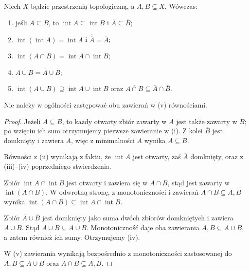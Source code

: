 \begin{twierdzenie}
\label{thm:topog-rachunek-wnetrz-domkniec}
Niech $X$ będzie przestrzenią topologiczną, a $A,B\subseteq X$.
Wówczas:
\begin{enumerate}[label=(\roman*)]
\item jeśli $A\subseteq B$, to
      $\operatorname{int}A\subseteq\operatorname{int}B$
      i $\overline A\subseteq\overline B$;
\item $\operatorname{int}(\operatorname{int}A)=\operatorname{int}A$
      i $\overline{\overline A}=\overline A$;
\item $\operatorname{int}(A\cap B)
      =\operatorname{int}A\cap\operatorname{int}B$;
\item $\overline{A\cup B}=\overline A\cup\overline B$;
\item $\operatorname{int}(A\cup B)\supseteq
      \operatorname{int}A\cup\operatorname{int}B$ oraz
      $\overline{A\cap B}\subseteq\overline A\cap\overline B$.
\end{enumerate}
Nie należy w ogólności zastępować obu zawierań w (v)
równościami.
\end{twierdzenie}
\begin{proof}
Jeżeli $A\subseteq B$, to każdy otwarty zbiór zawarty w $A$
jest także zawarty w $B$; po wzięciu ich sum otrzymujemy
pierwsze zawieranie w (i). Z kolei $\overline B$ jest
domknięty i zawiera $A$, więc z minimalności $\overline A$
wynika $\overline A\subseteq\overline B$.

Równości z (ii) wynikają z faktu, że $\operatorname{int}A$
jest otwarty, zaś $\overline A$ domknięty, oraz z (iii)--(iv)
poprzedniego stwierdzenia.

Zbiór $\operatorname{int}A\cap\operatorname{int}B$ jest otwarty
i zawiera się w $A\cap B$, stąd jest zawarty w
$\operatorname{int}(A\cap B)$. W odwrotną stronę,
z monotoniczności i zawierań $A\cap B\subseteq A,B$
wynika $\operatorname{int}(A\cap B)\subseteq
\operatorname{int}A\cap\operatorname{int}B$.

Zbiór $\overline A\cup\overline B$ jest domknięty
jako suma dwóch zbiorów domkniętych i zawiera $A\cup B$.
Stąd $\overline{A\cup B}\subseteq\overline A\cup\overline B$.
Monotoniczność daje oba zawierania
$\overline A,\overline B\subseteq\overline{A\cup B}$,
a zatem również ich sumy. Otrzymujemy (iv).

W (v) zawierania wynikają bezpośrednio z monotoniczności
zastosowanej do $A,B\subseteq A\cup B$ oraz
$A\cap B\subseteq A,B$.
\end{proof}

